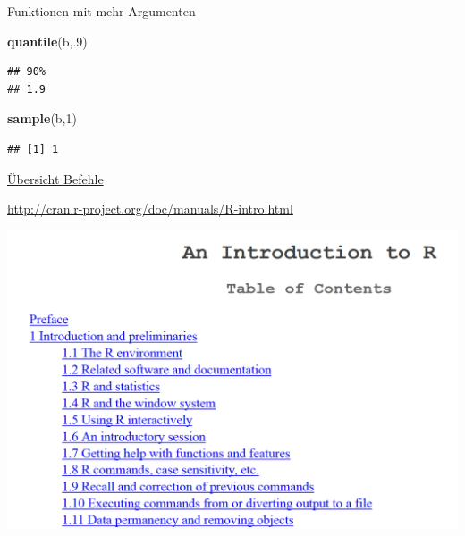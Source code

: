 \documentclass[
  ignorenonframetext,
]{beamer}
\newenvironment{Shaded}{\begin{snugshade}}{\end{snugshade}}
\newcommand{\DecValTok}[1]{\textcolor[rgb]{0.27,0.67,0.26}{#1}}
\newcommand{\KeywordTok}[1]{\textcolor[rgb]{0.26,0.66,0.93}{\textbf{#1}}}
\newcommand{\NormalTok}[1]{\textcolor[rgb]{0.74,0.68,0.62}{#1}}
\begin{document}
\begin{frame}[fragile]{Funktionen mit mehr Argumenten}
\protect\hypertarget{funktionen-mit-mehr-argumenten-1}{}

\begin{Shaded}
\begin{Highlighting}[]
\KeywordTok{quantile}\NormalTok{(b,.}\DecValTok{9}\NormalTok{)}
\end{Highlighting}
\end{Shaded}

\begin{verbatim}
## 90% 
## 1.9
\end{verbatim}

\begin{Shaded}
\begin{Highlighting}[]
\KeywordTok{sample}\NormalTok{(b,}\DecValTok{1}\NormalTok{) }
\end{Highlighting}
\end{Shaded}

\begin{verbatim}
## [1] 1
\end{verbatim}

\end{frame}

\begin{frame}{\href{http://cran.r-project.org/doc/manuals/R-intro.html}{Übersicht
Befehle}}
\protect\hypertarget{ubersicht-befehle}{}

\url{http://cran.r-project.org/doc/manuals/R-intro.html}

\includegraphics{figure/UebersichtBefehle.PNG}

\end{frame}
\end{document}
